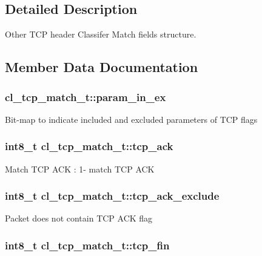 \subsection{Detailed Description}
Other T\-C\-P header Classifer Match fields structure. 

\subsection{Member Data Documentation}
\hypertarget{structcl__tcp__match__t_a56a6917691204e3902a9dee782faf4fc}{
\subsubsection[{param\-\_\-in\-\_\-ex}]{ cl\-\_\-tcp\-\_\-match\-\_\-t\-::param\-\_\-in\-\_\-ex}}\label{structcl__tcp__match__t_a56a6917691204e3902a9dee782faf4fc}
Bit-\/map to indicate included and excluded parameters of T\-C\-P flags \hypertarget{structcl__tcp__match__t_a4c8d0d419dbc541bbb925b49d2a18af8}{
\subsubsection[{tcp\-\_\-ack}]{\setlength{\rightskip}{0pt plus 5cm}int8\-\_\-t cl\-\_\-tcp\-\_\-match\-\_\-t\-::tcp\-\_\-ack}}\label{structcl__tcp__match__t_a4c8d0d419dbc541bbb925b49d2a18af8}
Match T\-C\-P A\-C\-K \-: 1-\/ match T\-C\-P A\-C\-K \hypertarget{structcl__tcp__match__t_aef633562984ce156cc0377eccf39fd58}{
\subsubsection[{tcp\-\_\-ack\-\_\-exclude}]{\setlength{\rightskip}{0pt plus 5cm}int8\-\_\-t cl\-\_\-tcp\-\_\-match\-\_\-t\-::tcp\-\_\-ack\-\_\-exclude}}\label{structcl__tcp__match__t_aef633562984ce156cc0377eccf39fd58}
Packet does not contain T\-C\-P A\-C\-K flag \hypertarget{structcl__tcp__match__t_ae1800016c2f4bb66c33b88cb972bbae5}{
\subsubsection[{tcp\-\_\-fin}]{\setlength{\rightskip}{0pt plus 5cm}int8\-\_\-t cl\-\_\-tcp\-\_\-match\-\_\-t\-::tcp\-\_\-fin}}\label{structcl__tcp__match__t_ae1800016c2f4bb66c33b88cb972bbae5}
